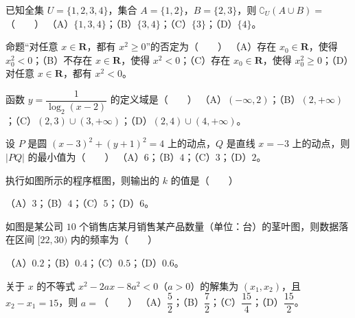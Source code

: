 \begin{question}
已知全集 $U=\{1,2,3,4\}$，集合 $A=\{1,2\}$，$B=\{2,3\}$，则 $\complement_U(A\cup B)=$\mbox{（　　）}
（A）$\{1,3,4\}$；（B）$\{3,4\}$；（C）$\{3\}$；（D）$\{4\}$。
\end{question}
\begin{question}
命题“对任意 $x\in\mathbf R$，都有 $x^2\geqslant0$”的否定为\mbox{（　　）}
（A）存在 $x_0\in\mathbf R$，使得 $x_0^2<0$；（B）不存在 $x\in\mathbf R$，使得 $x^2<0$；（C）存在 $x_0\in\mathbf R$，使得 $x_0^2\geqslant0$；（D）对任意 $x\in\mathbf R$，都有 $x^2<0$。
\end{question}
\begin{question}
函数 $y=\dfrac1{\log_2(x-2)}$ 的定义域是\mbox{（　　）}
（A）$(-\infty,2)$；（B）$(2,+\infty)$；（C）$(2,3)\cup(3,+\infty)$；（D）$(2,4)\cup(4,+\infty)$。
\end{question}
\begin{question}
设 $P$ 是圆 $(x-3)^2+(y+1)^2=4$ 上的动点，$Q$ 是直线 $x=-3$ 上的动点，则 $|PQ|$ 的最小值为\mbox{（　　）}
（A）$6$；（B）$4$；（C）$3$；（D）$2$。
\Needspace{0.4\textheight}
\end{question}
\begin{question}
执行如图所示的程序框图，则输出的 $k$ 的值是\mbox{（　　）}
\nopagebreak[4]
\begin{center}\end{center}
\nopagebreak[4]
（A）$3$；（B）$4$；（C）$5$；（D）$6$。
\Needspace{0.4\textheight}
\end{question}
\begin{question}
如图是某公司 $10$ 个销售店某月销售某产品数量（单位：台）的茎叶图，则数据落在区间 $[22,30)$ 内的频率为\mbox{（　　）}
\nopagebreak[4]
\begin{center}\end{center}
\nopagebreak[4]
（A）$0.2$；（B）$0.4$；（C）$0.5$；（D）$0.6$。
\end{question}
\begin{question}
关于 $x$ 的不等式 $x^2-2ax-8a^2<0$（$a>0$）的解集为 $(x_1,x_2)$，且 $x_2-x_1=15$，则 $a=$\mbox{（　　）}
（A）$\dfrac52$；（B）$\dfrac72$；（C）$\dfrac{15}4$；（D）$\dfrac{15}2$。
\Needspace{0.4\textheight}
\end{question}
